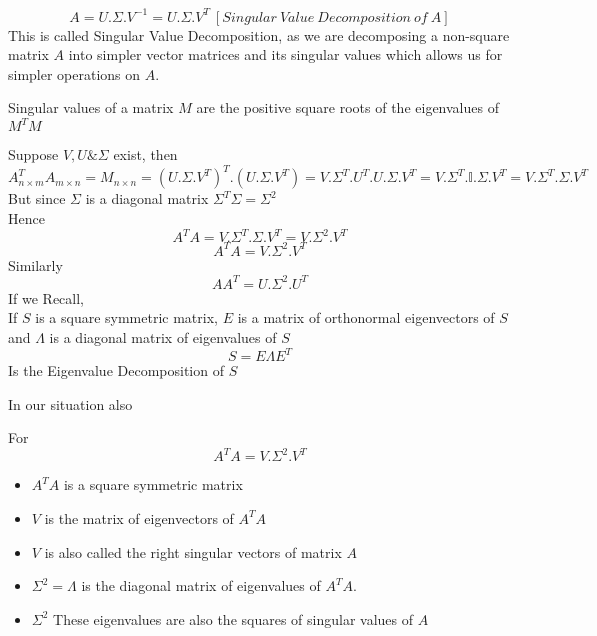 \documentclass{article}
\begin{document}
$$
  A=U.\Sigma.V^{-1}=U.\Sigma.V^{T} \ [Singular\ Value\ Decomposition\ of\ A]
$$
This is called Singular Value Decomposition, as we are decomposing a non-square matrix $A$ into simpler vector matrices and its singular values which allows us for simpler operations on $A$.\\
\begin{tcolorbox}[colback=blue!5!white,colframe=blue!75!black,title=Singular Values]
	Singular values of a matrix $M$ are the positive square roots of the eigenvalues of $M^TM$
  \end{tcolorbox}
Suppose $V,U \& \Sigma$ exist, then\\
$$
  A_{n \times m}^{T}A_{m \times n}=M_{n \times n}=(U.\Sigma.V^{T})^T.(U.\Sigma.V^{T})=V.\Sigma^{T}.U^T.U.\Sigma.V^{T}=V.\Sigma^{T}.\mathbb{I}.\Sigma.V^{T}=V.\Sigma^{T}.\Sigma.V^{T}
$$
But since $\Sigma$ is a diagonal matrix $\Sigma^T\Sigma=\Sigma^2$\\
Hence
$$
  A^{T}A=V.\Sigma^{T}.\Sigma.V^{T}=V.\Sigma^{2}.V^{T}
$$
$$
  A^{T}A=V.\Sigma^{2}.V^{T}
$$
Similarly
$$
  AA^{T}=U.\Sigma^{2}.U^{T}
$$
If we Recall,\\
If $S$ is a square symmetric matrix, $E$ is a matrix of orthonormal eigenvectors of $S$ and $\Lambda$ is a diagonal matrix of eigenvalues of $S$\\
$$
  S=E\Lambda E^T
$$
Is the Eigenvalue Decomposition of $S$\pagebreak

In our situation also\\

\begin{tcolorbox}[colback=blue!5!white,colframe=blue!75!black,title=Singular Value Decomposition $\Longleftrightarrow $ Eigenvalue Decomposition]
	For 
	$$
	  A^{T}A=V.\Sigma^{2}.V^{T}
	$$
	
	\begin{itemize}
		\item $A^{T}A$ is a square symmetric matrix
		\item $V$ is the matrix of eigenvectors of $A^{T}A$
		\item $V$ is also called the right singular vectors of matrix $A$
		\item $\Sigma^{2}=\Lambda$ is the diagonal matrix of eigenvalues of $A^{T}A$. 
		\item $\Sigma^{2}$ These eigenvalues are also the squares of singular values of $A$
	\end{itemize}
  \end{tcolorbox}
\end{document}
